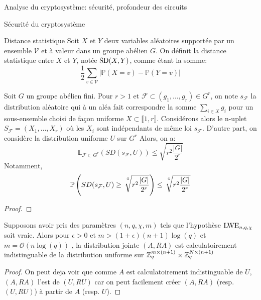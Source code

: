 \begin{section}{Analyse du cryptosystème: sécurité, profondeur des circuits}
	\begin{subsection}{Sécurité du cryptosystème}

	\begin{definition}{Distance statistique}
	Soit $X$ et $Y$ deux variables aléatoires supportée par
	un ensemble $\mathcal{V}$ et à valeur 
	dans un groupe abélien $G$. On définit la distance 
	statistique entre $X$ et $Y$, notée $\text{SD}(X,Y)$, 
	comme étant la somme:
	\[ \frac{1}{2} \sum_{v \in \mathcal{V}} |\mathbb{P}(X = v) -
	\mathbb{P}(Y = v)| \]


	\end{definition}
	\begin{lemme}
	Soit $G$ un groupe abélien fini. Pour $r > 1$ et 
	$\mathcal{F} \subset (g_1, \ldots, g_r) \in G^r$, on
	note
	 $s_\mathcal{F}$ la distribution aléatoire qui à un aléa
	 fait correspondre la somme $\sum_{i\in X} g_i$ pour un
	 sous-ensemble choisi de façon uniforme  $X\subset \llbracket
	 1, r \rrbracket$. 
	 Considérons alors le n-uplet $S_\mathcal{F} = (X_1, \ldots, X_r)$ où 
	 les $X_i$ sont indépendants de même loi
	 $s_\mathcal{F}$.
	 D'autre part, on considère la distribution uniforme
	 $U$ sur $G^r$
	 Alors, on a: 
	 \[\mathbb{E}_{\mathcal{F}\subset G^r}(SD(s_\mathcal{F},U)) \leq 
	   \sqrt{r^2\frac{|G|}{2^r}}\]
	 Notamment, 
	 \[\mathbb{P}\left(SD(s_\mathcal{F},U) \geq
		 \sqrt[\leftroot{-3}\uproot{8}4\:]{r^2\frac{|G|}{2^r}} \right) \leq
		 \sqrt[\leftroot{-3}\uproot{8}4\:]{r^2\frac{|G|}{2^r}}
	 \]
	\end{lemme}
	\begin{proof}
	\end{proof}
	\begin{prop}
	Supposons avoir pris des paramètres $(n, q, \chi, m)$
	tels que l'hypothèse $\text{LWE}_{n,q,\chi}$ soit vraie. Alors pour $\epsilon>0$
	et $m > (1+\epsilon)(n+1)\log(q)$ et $m = \mathcal{O}(n\log(q))$ , la distribution jointe 
	$(A, RA)$ est calculatoirement indistinguable de la
	distribution uniforme sur $\mathbb{Z}_q^{m \times (n+1)} \times \mathbb{Z}_q^{N
	\times (n+1)}$
	\end{prop}
	\begin{proof}
	On peut deja voir que comme $A$ est calculatoirement
	indistinguable de $U$, $(A, RA)$ l'est de $(U,RU)$ car on 
	peut facilement créer $(A, RA)$ (resp. $(U, RU)$) à partir de
	$A$ (resp. $U$).


\end{proof}
\end{subsection}
\end{section}
